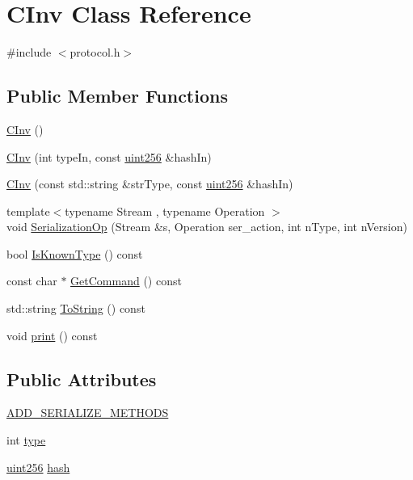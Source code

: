 \hypertarget{class_c_inv}{}\section{C\+Inv Class Reference}
\label{class_c_inv}


{\ttfamily \#include $<$protocol.\+h$>$}

\subsection*{Public Member Functions}
\begin{DoxyCompactItemize}
\item 
\hyperlink{class_c_inv_a831d208e5e1b142e36a89999b81c2298}{C\+Inv} ()
\item 
\hyperlink{class_c_inv_a4c6e02df7b10378f876ecc76c6b50301}{C\+Inv} (int type\+In, const \hyperlink{classuint256}{uint256} \&hash\+In)
\item 
\hyperlink{class_c_inv_a412cb8fdd0bfe185f770fec91a3e13c4}{C\+Inv} (const std\+::string \&str\+Type, const \hyperlink{classuint256}{uint256} \&hash\+In)
\item 
{\footnotesize template$<$typename Stream , typename Operation $>$ }\\void \hyperlink{class_c_inv_a7f56c1696e6c5c7ca36c1637f94dd1a0}{Serialization\+Op} (Stream \&s, Operation ser\+\_\+action, int n\+Type, int n\+Version)
\item 
bool \hyperlink{class_c_inv_a9259d1e8d828c6b6ea729d36d16cd84f}{Is\+Known\+Type} () const 
\item 
const char $\ast$ \hyperlink{class_c_inv_a393dc4726f105b25090a6ee4952e71b5}{Get\+Command} () const 
\item 
std\+::string \hyperlink{class_c_inv_a87a826a842d549c2747ced0c1a90bc18}{To\+String} () const 
\item 
void \hyperlink{class_c_inv_ac694be0201a6e5b34efa1c604498186c}{print} () const 
\end{DoxyCompactItemize}
\subsection*{Public Attributes}
\begin{DoxyCompactItemize}
\item 
\hyperlink{class_c_inv_a3dc91b40ff6fe8c2c8879c81de67e209}{A\+D\+D\+\_\+\+S\+E\+R\+I\+A\+L\+I\+Z\+E\+\_\+\+M\+E\+T\+H\+O\+D\+S}
\item 
int \hyperlink{class_c_inv_a2da8a26c6b8824011e3144459d278c75}{type}
\item 
\hyperlink{classuint256}{uint256} \hyperlink{class_c_inv_abfa04c38e9c0def9a2b09a9c43929744}{hash}
\end{DoxyCompactItemize}
